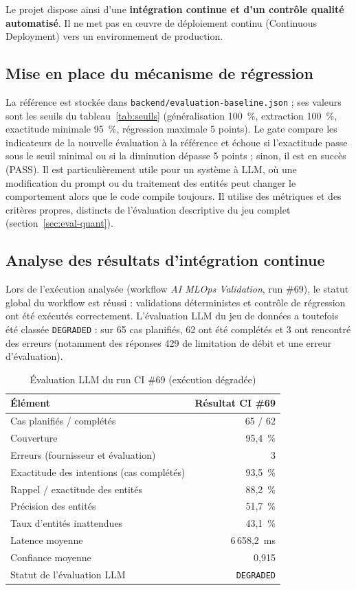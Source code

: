 \documentclass[11pt,a4paper,openany,oneside]{report}
\begin{document}
Le projet dispose ainsi d'une \textbf{intégration continue et d'un contrôle qualité automatisé}. Il ne met pas en œuvre de déploiement continu (Continuous Deployment) vers un environnement de production.

\subsection{Mise en place du mécanisme de régression}
La référence est stockée dans \texttt{backend/evaluation-baseline.json} ; ses valeurs sont les seuils du tableau~\ref{tab:seuils} (généralisation 100~\%, extraction 100~\%, exactitude minimale 95~\%, régression maximale 5 points). Le gate compare les indicateurs de la nouvelle évaluation à la référence et échoue si l'exactitude passe sous le seuil minimal ou si la diminution dépasse 5 points ; sinon, il est en succès (PASS). Il est particulièrement utile pour un système à LLM, où une modification du prompt ou du traitement des entités peut changer le comportement alors que le code compile toujours. Il utilise des métriques et des critères propres, distincts de l'évaluation descriptive du jeu complet (section~\ref{sec:eval-quant}).

\subsection{Analyse des résultats d'intégration continue}\label{sec:ci-analyse}
Lors de l'exécution analysée (workflow \emph{AI MLOps Validation}, run \#69), le statut global du workflow est réussi : validations déterministes et contrôle de régression ont été exécutés correctement. L'évaluation LLM du jeu de données a toutefois été classée \texttt{DEGRADED} : sur 65 cas planifiés, 62 ont été complétés et 3 ont rencontré des erreurs (notamment des réponses 429 de limitation de débit et une erreur d'évaluation).

\begin{table}[htbp]
\centering\small
\caption{Évaluation LLM du run CI \#69 (exécution dégradée)}\label{tab:ci69}
\begin{tabularx}{\textwidth}{@{}Xr@{}}
\toprule
\textbf{Élément} & \textbf{Résultat CI \#69} \\
\midrule
Cas planifiés / complétés & 65 / 62 \\
Couverture & 95,4~\% \\
Erreurs (fournisseur et évaluation) & 3 \\
Exactitude des intentions (cas complétés) & 93,5~\% \\
Rappel / exactitude des entités & 88,2~\% \\
Précision des entités & 51,7~\% \\
Taux d'entités inattendues & 43,1~\% \\
Latence moyenne & 6\,658,2~ms \\
Confiance moyenne & 0,915 \\
Statut de l'évaluation LLM & \texttt{DEGRADED} \\
\bottomrule
\end{tabularx}
\end{table}
\end{document}
